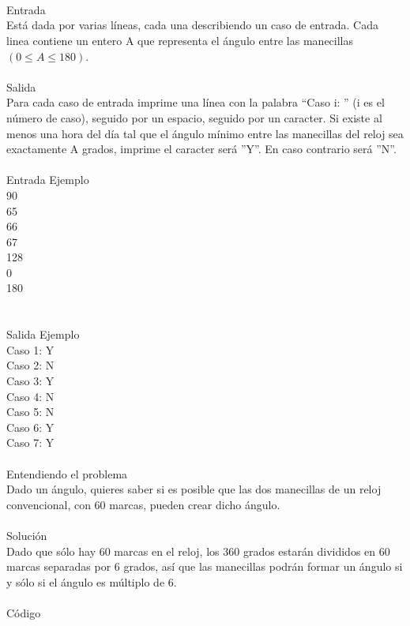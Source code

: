 \documentclass[12pt]{article}
\begin{document}
\\
\\
\\
\textrm{\large Entrada}
\\
Está dada por varias líneas, cada una describiendo un caso de entrada. Cada linea contiene un entero A que
representa el ángulo entre las manecillas $(0 ≤ A ≤ 180)$.
\\
\\
\textrm{\large Salida}
\\
Para cada caso de entrada imprime una línea con la palabra “Caso i: ” (i es el número de caso), seguido por un espacio, seguido por un caracter. Si existe al menos una hora del día tal que el ángulo mínimo entre las manecillas del reloj sea exactamente A grados, imprime el caracter será ”Y”. En caso contrario será ”N”.
\\
\\
\textrm{\large Entrada Ejemplo}
\\
90\\
65\\
66\\
67\\
128\\
0\\
180\\
\\
\\
\textrm{\large Salida Ejemplo}
\\
Caso 1: Y\\
Caso 2: N\\
Caso 3: Y\\
Caso 4: N\\
Caso 5: N\\
Caso 6: Y\\
Caso 7: Y\\
\\
\textrm{\large Entendiendo el problema}\\
Dado un ángulo, quieres saber si es posible que las dos manecillas de un reloj convencional, con 60 marcas, pueden crear dicho ángulo.\\
\\
\textrm{\large Solución}\\
Dado que sólo hay 60 marcas en el reloj, los 360 grados estarán divididos en 60 marcas separadas por 6 grados, así que las manecillas podrán formar un ángulo si y sólo si el ángulo es múltiplo de 6.\\
\\
\textrm{\large Código}\\
\end{document}
